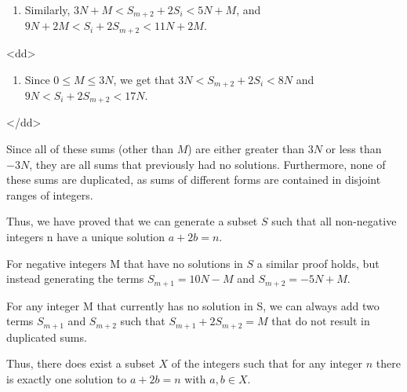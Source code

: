 \begin{enumerate}
            \begin{enumerate}[label=(\roman*)]
                \item Similarly, $3N + M < S_{m+2}+2S_i < 5N + M$, and $9N+2M < S_i+2S_{m+2} < 11N+2M$.
            \end{enumerate}
            
            \begin{enumerate}[label=(\roman*)]
                <dd>
            \begin{enumerate}[label=(\roman*)]
                \item Since $0 \le M \le 3N$, we get that  $3N < S_{m+2}+2S_i < 8N$ and $9N < S_i+2S_{m+2} < 17N$.
            \end{enumerate}
            </dd>
            \end{enumerate}
            Since all of these sums (other than $M$) are either greater than $3N$ or less than $-3N$, they are all sums that previously had no solutions. Furthermore, none of these sums are duplicated, as sums of different forms are contained in disjoint ranges of integers.

 Thus, we have proved that we can generate a subset $S$ such that all non-negative integers n have a unique solution $a + 2b = n$.

 
For negative integers M that have no solutions in $S$ a similar proof holds, but instead generating the terms $S_{m+1} = 10N - M$ and $S_{m+2} = -5N + M$.

 
For any integer M that currently has no solution in S, we can always add two terms $S_{m+1}$ and $S_{m+2}$ such that $S_{m+1} + 2S_{m+2} = M$ that do not result in duplicated sums.

 Thus, there does exist a subset $X$ of the integers such that for any integer $n$ there is exactly one solution to $a + 2b = n$ with $a, b \in X$.

 


\end{enumerate}